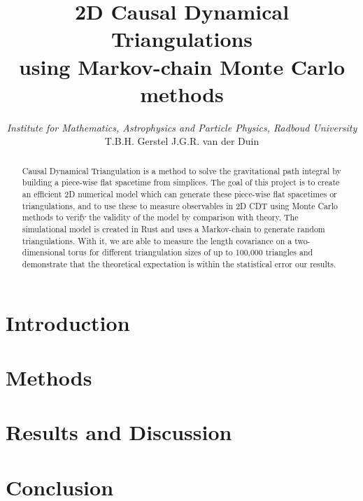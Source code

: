 \documentclass{article}
\title{{\huge 2D Causal Dynamical Triangulations} \\ {\Large using Markov-chain Monte Carlo methods}}
\author{\textit{Institute for Mathematics, Astrophysics and Particle Physics, Radboud University} \\[1mm] T.B.H. Gerstel \hspace{1cm} J.G.R. van der Duin}
\begin{document}
\maketitle

\begin{abstract} %
    Causal Dynamical Triangulation is a method to solve the gravitational path integral by building a piece-wise flat spacetime from simplices.
    The goal of this project is to create an efficient 2D numerical model which can generate these piece-wise flat spacetimes or triangulations, and to use these to measure observables in 2D CDT using Monte Carlo methods to verify the validity of the model by comparison with theory.
    The simulational model is created in Rust and uses a Markov-chain to generate random triangulations.
    With it, we are able to measure the length covariance on a two-dimensional torus for different triangulation sizes of up to 100,000 triangles and demonstrate that the theoretical expectation is within the statistical error our results.
\end{abstract}

\newpage

\section{Introduction}


\section{Methods}


\section{Results and Discussion}


\section{Conclusion}


\printbibliography

\appendix
\end{document}
